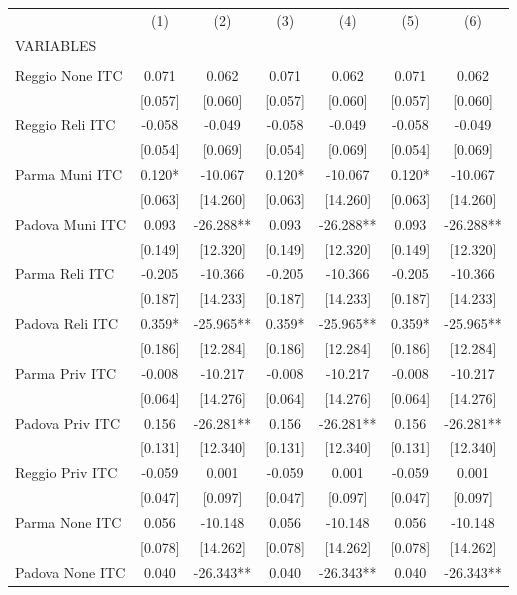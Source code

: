\begin{tabular}{lcccccc} \hline
 & (1) & (2) & (3) & (4) & (5) & (6) \\
VARIABLES &  &  &  &  &  &  \\ \hline
 &  &  &  &  &  &  \\
Reggio None ITC & 0.071 & 0.062 & 0.071 & 0.062 & 0.071 & 0.062 \\
 & [0.057] & [0.060] & [0.057] & [0.060] & [0.057] & [0.060] \\
Reggio Reli ITC & -0.058 & -0.049 & -0.058 & -0.049 & -0.058 & -0.049 \\
 & [0.054] & [0.069] & [0.054] & [0.069] & [0.054] & [0.069] \\
Parma Muni ITC & 0.120* & -10.067 & 0.120* & -10.067 & 0.120* & -10.067 \\
 & [0.063] & [14.260] & [0.063] & [14.260] & [0.063] & [14.260] \\
Padova Muni ITC & 0.093 & -26.288** & 0.093 & -26.288** & 0.093 & -26.288** \\
 & [0.149] & [12.320] & [0.149] & [12.320] & [0.149] & [12.320] \\
Parma Reli ITC & -0.205 & -10.366 & -0.205 & -10.366 & -0.205 & -10.366 \\
 & [0.187] & [14.233] & [0.187] & [14.233] & [0.187] & [14.233] \\
Padova Reli ITC & 0.359* & -25.965** & 0.359* & -25.965** & 0.359* & -25.965** \\
 & [0.186] & [12.284] & [0.186] & [12.284] & [0.186] & [12.284] \\
Parma Priv ITC & -0.008 & -10.217 & -0.008 & -10.217 & -0.008 & -10.217 \\
 & [0.064] & [14.276] & [0.064] & [14.276] & [0.064] & [14.276] \\
Padova Priv ITC & 0.156 & -26.281** & 0.156 & -26.281** & 0.156 & -26.281** \\
 & [0.131] & [12.340] & [0.131] & [12.340] & [0.131] & [12.340] \\
Reggio Priv ITC & -0.059 & 0.001 & -0.059 & 0.001 & -0.059 & 0.001 \\
 & [0.047] & [0.097] & [0.047] & [0.097] & [0.047] & [0.097] \\
Parma None ITC & 0.056 & -10.148 & 0.056 & -10.148 & 0.056 & -10.148 \\
 & [0.078] & [14.262] & [0.078] & [14.262] & [0.078] & [14.262] \\
Padova None ITC & 0.040 & -26.343** & 0.040 & -26.343** & 0.040 & -26.343** \\

\end{tabular}
